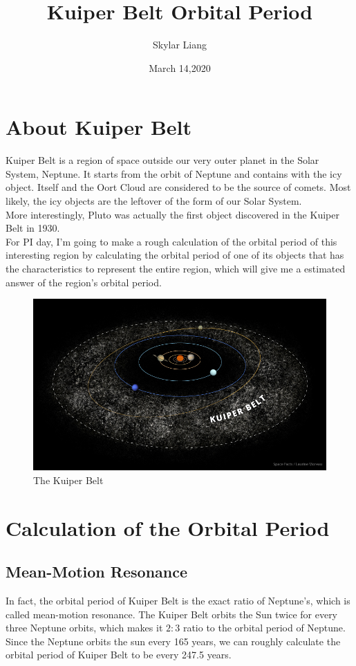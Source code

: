 \documentclass{article}
\title{Kuiper Belt Orbital Period}
\author{Skylar Liang }
\date{March 14,2020}
\begin{document}
\maketitle

\section{About Kuiper Belt}
Kuiper Belt is a region of space outside our very outer planet in the Solar System, Neptune. It starts from the orbit of Neptune and contains with the icy object. Itself and the Oort Cloud are considered to be the source of comets\citep{kuiper}. Most likely, the icy objects are the leftover of the form of our Solar System. \\
More interestingly, Pluto was actually the first object discovered in the Kuiper Belt in 1930\citep{kuiper}. \\
For PI day, I'm going to make a rough calculation of the orbital period of this interesting region by calculating the orbital period of one of its objects that has the characteristics to represent the entire region, which will give me a estimated answer of the region's orbital period.

\begin{figure}[h!]
\centering
\includegraphics[scale=0.4]{kuiper-belt.png}
\caption{The Kuiper Belt}
\label{fig:kuiper-belt}
\end{figure}

\section{Calculation of the Orbital Period}
\subsection{Mean-Motion Resonance}
In fact, the orbital period of Kuiper Belt is the exact ratio of Neptune's, which is called mean-motion resonance. The Kuiper Belt orbits the Sun twice for every three Neptune orbits\citep{resonance}, which makes it $2:3$ ratio to the orbital period of Neptune. Since the Neptune orbits the sun every 165 years, we can roughly calculate the orbital period of Kuiper Belt to be every 247.5 years.
\end{document}
